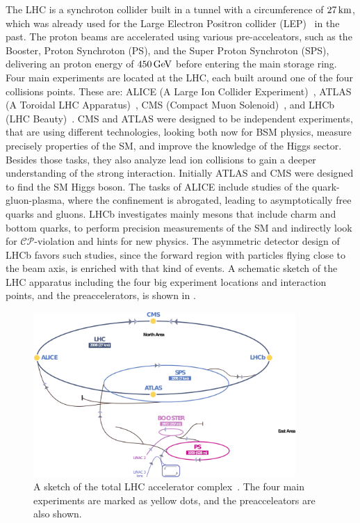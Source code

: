 The LHC is a synchroton collider built in a tunnel with a circumference of $27\,\text{km}$, which was already used for the Large Electron Positron collider (LEP)~\cite{LEPCollider} in the past. The proton beams are accelerated using various pre-acceleators, such as the Booster, Proton Synchroton (PS), and the Super Proton Synchroton (SPS), delivering an proton energy of $450\,\text{Ge\hspace{-.08em}V}$ before entering the main storage ring. Four main experiments are located at the LHC, each built around one of the four collisions points. These are: ALICE (A Large Ion Collider Experiment)~\cite{ALICE}, ATLAS (A Toroidal LHC Apparatus)~\cite{ATLAS}, CMS (Compact Muon Solenoid)~\cite{CMS}, and LHCb (LHC Beauty)~\cite{LHCb}. CMS and ATLAS were designed to be independent experiments, that are using different technologies, looking both now for BSM physics, measure precisely properties of the SM, and improve the knowledge of the Higgs sector. Besides those tasks, they also analyze lead ion collisions to gain a deeper understanding of the strong interaction. Initially ATLAS and CMS were designed to find the SM Higgs boson. The tasks of ALICE include studies of the quark-gluon-plasma, where the confinement is abrogated, leading to asymptotically free quarks and gluons. LHCb investigates mainly mesons that include charm and bottom quarks, to perform precision measurements of the SM and indirectly look for $\mathcal{CP}$-violation and hints for new physics. The asymmetric detector design of LHCb favors such studies, since the forward region with particles flying close to the beam axis, is enriched with that kind of events. A schematic sketch of the LHC apparatus including the four big experiment locations and interaction points, and the preaccelerators, is shown in .\\
\begin{figure}[tbp]
 \centering
 \includegraphics[width=0.89\textwidth]{figures/general/LHC}
 \caption{A sketch of the total LHC accelerator complex~\cite{LHCPicture}. The four main experiments are marked as yellow dots, and the preacceleators are also shown.}
 \label{fig:LHC}
\end{figure}
